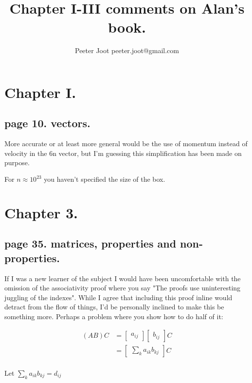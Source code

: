 \documentclass{article}
\title{ Chapter I-III comments on Alan's book. }
\author{Peeter Joot \quad peeter.joot@gmail.com}
\begin{document}

\section{Chapter I. }

\subsection{page 10. vectors. }

More accurate or at least more general would be the use of
momentum instead of velocity in the 6n vector, but I'm 
guessing this simplification has been made on purpose.


For $n \approx 10^{23}$ you haven't specified the size of the box.

\section{Chapter 3. }

\subsection{page 35. matrices, properties and non-properties. } 

If I was a new learner of the subject I would have been uncomfortable with
the omission
of the associativity proof where you say "The proofs use uninteresting juggling of the indexes".  While I agree that including this proof inline would detract
from the flow of things, I'd be personally inclined to make this be
something more.  Perhaps a problem where you show how to do half of it:

\begin{align*}
(AB) C
&= 
\begin{bmatrix}
a_{ij} 
\end{bmatrix} 
\begin{bmatrix}
b_{ij} 
\end{bmatrix} C \\
&= 
\begin{bmatrix}
\sum_k a_{ik} b_{kj} 
\end{bmatrix} C \\
\end{align*}

Let $\sum_k a_{ik} b_{kj} = d_{ij}$
\end{document}
